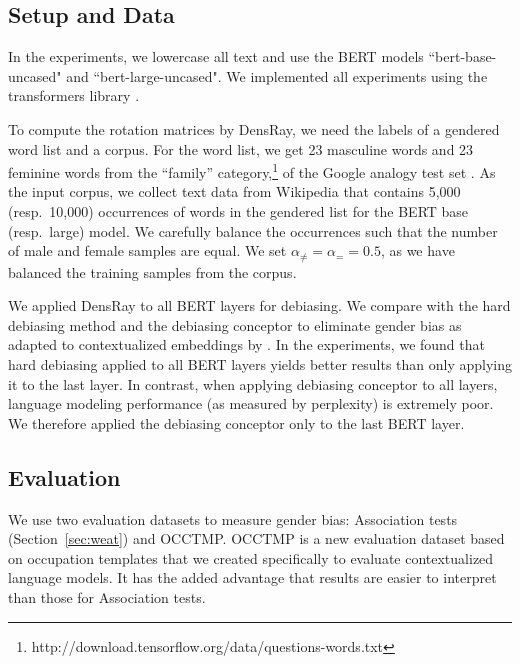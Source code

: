 \subsection{Setup and Data}
In the experiments, we lowercase all text and use the BERT models ``bert-base-uncased" and ``bert-large-uncased". We implemented all experiments using the transformers library \cite{wolf2019huggingfaces}.

To compute the rotation matrices by DensRay, we need the
labels of a gendered word list and a corpus. For the word
list, we get 23 masculine words and 23 feminine words from
the ``family''
category,\footnote{http://download.tensorflow.org/data/questions-words.txt}
of the Google analogy test set \cite{mikolov2013efficient}. As the input corpus, we collect text data from Wikipedia that contains 5,000 (resp.\ 10,000)
occurrences of words in the gendered list for the BERT base
(resp.\ large) model. We carefully balance the occurrences such that the number of male and female samples are equal. We set  $\alpha_{\neq}=\alpha_{=}=0.5$, as we have balanced the training samples from the corpus.

We applied DensRay to all BERT layers for debiasing. We
compare with the hard debiasing method \cite{mu2018all} and
the debiasing conceptor \cite{karve2019conceptor} to
eliminate gender bias as adapted to contextualized
embeddings by \cite{karve2019conceptor}. In the experiments, we found that hard debiasing applied to all BERT layers
yields better results than only applying it to the last layer. In contrast, when applying debiasing conceptor
to all layers, language modeling performance (as measured by
perplexity) is extremely poor.
We therefore applied the
debiasing conceptor only to the last BERT layer.

\subsection{Evaluation}
We use two evaluation datasets to measure gender bias: Association tests (Section~\ref{sec:weat}) and OCCTMP.
OCCTMP is a new evaluation dataset based on occupation templates
that we created specifically to evaluate contextualized language models.  It has the added advantage that results are easier to interpret than those for Association tests.

